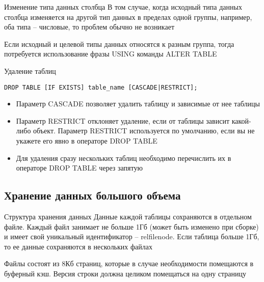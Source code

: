 \documentclass[12pt]{article}
\begin{document}
\begin{nota}{Изменение типа данных столбца}
    В том случае, когда исходный типа данных столбца изменяется на другой тип данных в пределах одной группы, например, оба типа -- числовые, то проблем обычно не возникает 

    Если исходный и целевой типы данных относятся к разным группа, тогда потребуется использование фразы USING команды ALTER TABLE 
\end{nota}

\begin{nota}{Удаление таблиц}
\begin{lstlisting}
DROP TABLE [IF EXISTS] table_name [CASCADE|RESTRICT];
\end{lstlisting}

    \begin{itemize}
        \item Параметр CASCADE позволяет удалить таблицу и зависимые от нее таблицы 
        \item Параметр RESTRICT отклоняет удаление, если от таблицы зависит какой-либо объект. Параметр RESTRICT используется по умолчанию, если вы не укажете его явно в операторе DROP TABLE
        \item Для удаления сразу нескольких таблиц необходимо перечислить их в операторе DROP TABLE через запятую 
    \end{itemize}
\end{nota}

\newpage 

\subsection{Хранение данных большого объема}

\begin{nota}{Структура хранения данных}
    Данные каждой таблицы сохраняются в отдельном файле. Каждый файл занимает не больше 1Гб (может быть изменено при сборке) и имеет свой уникальный идентификатор -- relfilenode. Если таблица больше 1Гб, то ее данные сохраняются в нескольких файлах 

    Файлы состоят из 8Кб страниц, которые в случае необходимости помещаются в буферный кэш. Версия строки должна целиком помещаться на одну страницу 
\end{nota}
\end{document}
